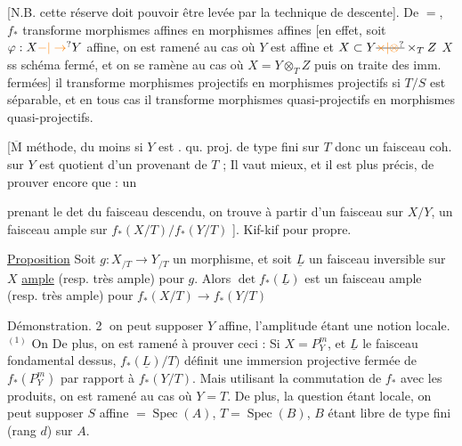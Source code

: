 

[N.B. cette réserve doit pouvoir être levée par la technique de descente]. De $=$,  $f_*$ transforme  morphismes affines en morphismes affines [en effet, soit $\varphi:X\unsure{-|\to}Y$ affine,  on est ramené  au cas où $Y$ est affine et $X\subset Y\deleted{\unsure{\times|\otimes}}\times_T Z$  $X$ ss schéma fermé,  et on se ramène au cas où $X=Y\mathbin{\otimes}_T Z$ puis on traite des imm. fermées] il transforme morphismes projectifs en morphismes projectifs si $T/S$ est séparable, et en tous cas il transforme morphismes quasi-projectifs en morphismes quasi-projectifs.

[$\overline{\mathrm M}$ méthode, du moins si  $Y$ est .  qu. proj. de type fini sur $T$ donc un faisceau coh. sur $Y$ est quotient d'un provenant de $T$ ; Il vaut mieux, et il est plus précis, de prouver encore que : un


prenant le det du faisceau descendu, on trouve à partir d'un faisceau  sur $X/Y$, un faisceau ample sur $f_*(X/T)/f_*(Y/T)$ ]. Kif-kif pour propre.

\uline{Proposition} Soit $g:X_{/T}\to Y_{/T}$ un morphisme, et soit $\underline L$ un faisceau inversible sur $X$ \uline{ample}  (resp. très ample) pour $g$. Alors $\det f_*(\underline L)$ est un faisceau ample (resp. très ample) pour $f_*(X/T)\longrightarrow f_*(Y/T)$

Démonstration. \textcircled{2} on peut supposer $Y$ affine,  l'amplitude  étant une notion locale. $^{(1)}$ On   De plus, on est ramené à prouver ceci : Si $X=P^m_Y$, et $\underline L$ le faisceau fondamental dessus,  $f_*(\underline L)/T)$  définit une immersion projective fermée de $f_*(P^m_Y)$ par rapport à $f_*(Y/T)$. Mais utilisant la commutation de $f_*$ avec les produits, on est ramené au cas où $Y=T$. De plus, la question étant locale, on peut supposer $S$ affine $=\operatorname{Spec}(A)$, $T=\operatorname{Spec}(B)$, $B$ étant libre de type fini (rang $d$) sur $A$.

